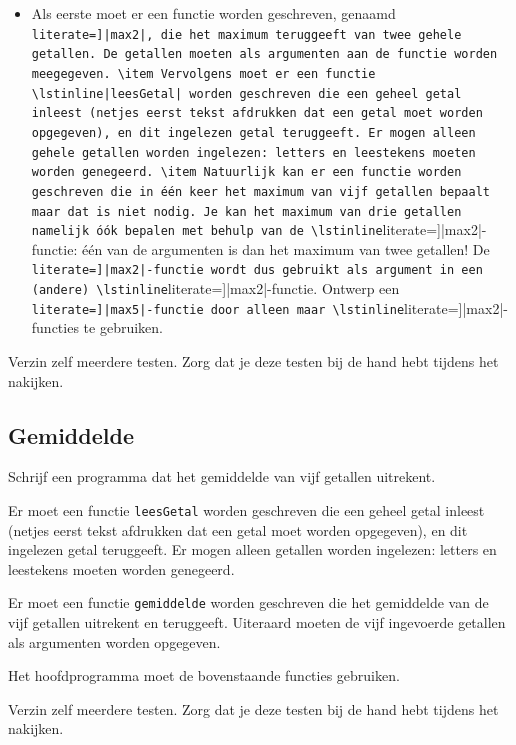 \documentclass[a4paper,10pt,fleqn,twoside]{article}
\begin{document}
\begin{itemize}
\item Als eerste moet er een functie worden geschreven, genaamd \lstinline[literate=]|max2|, die het maximum teruggeeft van twee gehele getallen. De getallen moeten als argumenten aan de functie worden meegegeven.
\item Vervolgens moet er een functie \lstinline|leesGetal| worden geschreven die een geheel getal inleest (netjes eerst tekst afdrukken dat een getal moet worden opgegeven), en dit ingelezen getal teruggeeft. Er mogen alleen gehele getallen worden ingelezen: letters en leestekens moeten worden genegeerd.
\item Natuurlijk kan er een functie worden geschreven die in één keer het maximum van vijf getallen bepaalt maar dat is niet nodig. Je kan het maximum van drie getallen namelijk óók bepalen met behulp van de \lstinline[literate=]|max2|-functie: één van de argumenten is dan het maximum van twee getallen! De \lstinline[literate=]|max2|-functie wordt dus gebruikt als argument in een (andere) \lstinline[literate=]|max2|-functie. Ontwerp een \lstinline[literate=]|max5|-functie door alleen maar \lstinline[literate=]|max2|-functies te gebruiken.
\end{itemize}

Verzin zelf meerdere testen. Zorg dat je deze testen bij de hand hebt tijdens het nakijken.

\subsection{Gemiddelde}
Schrijf een programma dat het gemiddelde van vijf getallen uitrekent.

Er moet een functie \lstinline|leesGetal| worden geschreven die een geheel getal inleest (netjes eerst tekst afdrukken dat een getal moet worden opgegeven), en dit ingelezen getal teruggeeft. Er mogen alleen getallen worden ingelezen: letters en leestekens moeten worden genegeerd.

Er moet een functie \lstinline|gemiddelde| worden geschreven die het gemiddelde van de vijf getallen uitrekent en teruggeeft. Uiteraard moeten de vijf ingevoerde getallen als argumenten worden opgegeven.

Het hoofdprogramma moet de bovenstaande functies gebruiken.

Verzin zelf meerdere testen. Zorg dat je deze testen bij de hand hebt tijdens het nakijken.
\end{document}
